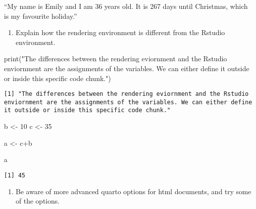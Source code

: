 \documentclass[
  letterpaper,
  DIV=11,
  numbers=noendperiod]{scrartcl}
\newenvironment{Shaded}{\begin{snugshade}}{\end{snugshade}}
\newcommand{\DecValTok}[1]{\textcolor[rgb]{0.68,0.00,0.00}{#1}}
\newcommand{\FunctionTok}[1]{\textcolor[rgb]{0.28,0.35,0.67}{#1}}
\newcommand{\NormalTok}[1]{\textcolor[rgb]{0.00,0.23,0.31}{#1}}
\newcommand{\OtherTok}[1]{\textcolor[rgb]{0.00,0.23,0.31}{#1}}
\newcommand{\SpecialCharTok}[1]{\textcolor[rgb]{0.37,0.37,0.37}{#1}}
\newcommand{\StringTok}[1]{\textcolor[rgb]{0.13,0.47,0.30}{#1}}
\providecommand{\tightlist}{%
  \setlength{\itemsep}{0pt}\setlength{\parskip}{0pt}}\usepackage{longtable,booktabs,array}
\begin{document}
``My name is Emily and I am 36 years old. It is 267 days until
Christmas, which is my favourite holiday.''

\begin{enumerate}
\def\labelenumi{\arabic{enumi}.}
\setcounter{enumi}{10}
\tightlist
\item
  Explain how the rendering environment is different from the Rstudio
  environment.
\end{enumerate}

\begin{Shaded}
\begin{Highlighting}[]
\FunctionTok{print}\NormalTok{(}\StringTok{"The differences between the rendering eviornment and the Rstudio enviornment are the assignments of the variables. We can either define it outside or inside this specific code chunk."}\NormalTok{)}
\end{Highlighting}
\end{Shaded}

\begin{verbatim}
[1] "The differences between the rendering eviornment and the Rstudio enviornment are the assignments of the variables. We can either define it outside or inside this specific code chunk."
\end{verbatim}

\begin{Shaded}
\begin{Highlighting}[]
\NormalTok{b }\OtherTok{\textless{}{-}} \DecValTok{10}
\NormalTok{c }\OtherTok{\textless{}{-}} \DecValTok{35} 

\NormalTok{a }\OtherTok{\textless{}{-}}\NormalTok{ c}\SpecialCharTok{+}\NormalTok{b }

\NormalTok{a}
\end{Highlighting}
\end{Shaded}

\begin{verbatim}
[1] 45
\end{verbatim}

\begin{enumerate}
\def\labelenumi{\arabic{enumi}.}
\setcounter{enumi}{11}
\tightlist
\item
  Be aware of more advanced quarto options for html documents, and try
  some of the options.
\end{enumerate}
\end{document}
